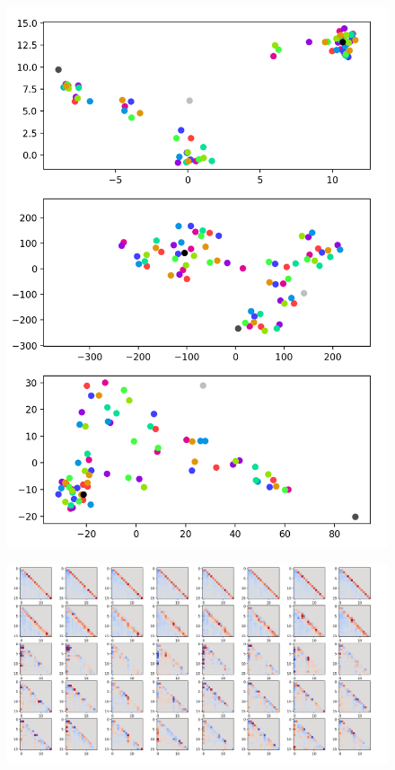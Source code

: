 \documentclass{article}
\begin{document}
\begin{figure}
    \includegraphics[width=\textwidth]{images/umap-tsne-pca.png}
\end{figure}

\begin{figure}
    \includegraphics[width=\textwidth]{images/pca-components.png}
\end{figure}
\end{document}
